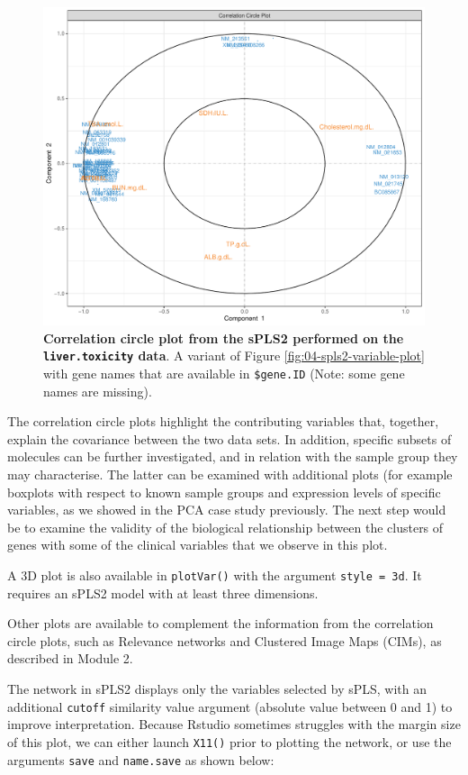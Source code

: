 \documentclass[
]{book}
\begin{document}
\begin{figure}

{\centering \includegraphics[width=0.7\linewidth]{Figures/PLS/04-spls2-variable-plot2-1} 

}

\caption{\textbf{Correlation circle plot from the sPLS2 performed on the \texttt{liver.toxicity} data}. A variant of Figure \ref{fig:04-spls2-variable-plot} with gene names that are available in \texttt{\$gene.ID} (Note: some gene names are missing).}\label{fig:04-spls2-variable-plot2}
\end{figure}



The correlation circle plots highlight the contributing variables that, together, explain the covariance between the two data sets. In addition, specific subsets of molecules can be further investigated, and in relation with the sample group they may characterise. The latter can be examined with additional plots (for example boxplots with respect to known sample groups and expression levels of specific variables, as we showed in the PCA case study previously. The next step would be to examine the validity of the biological relationship between the clusters of genes with some of the clinical variables that we observe in this plot.

A 3D plot is also available in \texttt{plotVar()} with the argument \texttt{style\ =\ \textquotesingle{}3d}. It requires an sPLS2 model with at least three dimensions.

Other plots are available to complement the information from the correlation circle plots, such as Relevance networks and Clustered Image Maps (CIMs), as described in Module 2.

The network in sPLS2 displays only the variables selected by sPLS, with an additional \texttt{cutoff} similarity value argument (absolute value between 0 and 1) to improve interpretation. Because Rstudio sometimes struggles with the margin size of this plot, we can either launch \texttt{X11()} prior to plotting the network, or use the arguments \texttt{save} and \texttt{name.save} as shown below:
\end{document}
